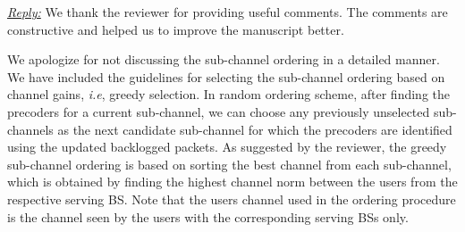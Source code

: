 
\vspace{1eM}
\underline{\textit{Reply:}} We thank the reviewer for providing useful comments. The comments are constructive and helped us to improve the manuscript better.

\begin{enumerate}

 

\resp We apologize for not discussing the sub-channel ordering in a detailed manner. We have included the guidelines for selecting the sub-channel ordering based on channel gains, \textit{i.e}, greedy selection. In random ordering scheme, after finding the precoders for a current sub-channel, we can choose any previously unselected sub-channels as the next candidate sub-channel for which the precoders are identified using the updated backlogged packets. As suggested by the reviewer, the greedy sub-channel ordering is based on sorting the best channel from each sub-channel, which is obtained by finding the highest channel norm between the users from the respective serving \ac{BS}. Note that the users channel used in the ordering procedure is the channel seen by the users with the corresponding serving \acp{BS} only.


\end{enumerate}
